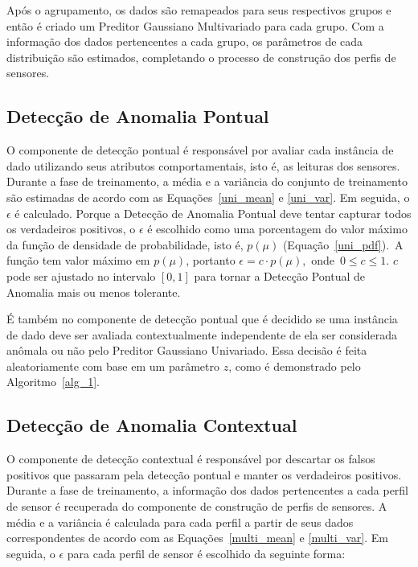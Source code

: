 \documentclass[cic,tc]{iiufrgs}
\begin{document}
Após o agrupamento, os dados são remapeados para seus respectivos grupos e então é criado um Preditor Gaussiano Multivariado para cada grupo. Com a informação dos dados pertencentes a cada grupo, os parâmetros de cada distribuição são estimados, completando o processo de construção dos perfis de sensores.

\subsection{Detecção de Anomalia Pontual}
\label{sistema_pont}
O componente de detecção pontual é responsável por avaliar cada instância de dado utilizando seus atributos comportamentais, isto é, as leituras dos sensores. Durante a fase de treinamento, a média e a variância do conjunto de treinamento são estimadas de acordo com as Equações~\ref{uni_mean} e \ref{uni_var}. Em seguida, o $\epsilon$ é calculado. Porque a Detecção de Anomalia Pontual deve tentar capturar todos os verdadeiros positivos, o $\epsilon$ é escolhido como uma porcentagem do valor máximo da função de densidade de probabilidade, isto é, $p(\mu)$ (Equação~\ref{uni_pdf}).~A função tem valor máximo em $p(\mu)$, portanto $\epsilon = c \cdot p(\mu)$,~onde~$0 \leq c \leq 1$. $c$ pode ser ajustado no intervalo $[0,1]$ para tornar a Detecção Pontual de Anomalia mais ou menos tolerante.

É também no componente de detecção pontual que é decidido se uma instância de dado deve ser avaliada contextualmente independente de ela ser considerada anômala ou não pelo Preditor Gaussiano Univariado. Essa decisão é feita aleatoriamente com base em um parâmetro $z$, como é demonstrado pelo Algoritmo~\ref{alg_1}.

\subsection{Detecção de Anomalia Contextual}
\label{sistema_contxt}
O componente de detecção contextual é responsável por descartar os falsos positivos que passaram pela detecção pontual e manter os verdadeiros positivos. Durante a fase de treinamento, a informação dos dados pertencentes a cada perfil de sensor é recuperada do componente de construção de perfis de sensores. A média e a variância é calculada para cada perfil a partir de seus dados correspondentes de acordo com as Equações~\ref{multi_mean} e \ref{multi_var}. Em seguida, o $\epsilon$ para cada perfil de sensor é escolhido da seguinte forma:
\end{document}
